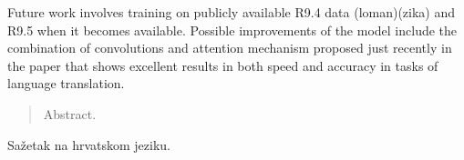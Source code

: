 \documentclass[times, utf8, diplomski, numeric, english]{fer}
\begin{document}
Future work involves training on publicly available R9.4 data (loman)(zika) and R9.5 when it becomes available. Possible improvements of the model include the combination of convolutions and attention mechanism proposed just recently in the paper that shows excellent results in both speed and accuracy in tasks of language translation. 





\begin{abstract}
Abstract.

\end{abstract}

\begin{sazetak}
Sažetak na hrvatskom jeziku.

\end{sazetak}
\end{document}
